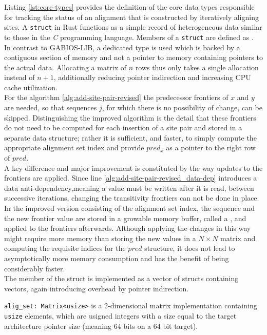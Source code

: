 Listing \ref{lst:core-types} provides the definition of the core data types responsible for tracking the status of an alignment that is constructed by iteratively aligning sites. A \texttt{struct} in Rust functions as a simple record of heterogeneous data similar to those in the \textit{C} programming language. Members of a \texttt{struct} are defined as .\\
In contrast to GABIOS-LIB, a dedicated  type is used which is backed by a contiguous section of memory and not a pointer to memory containing pointers to the actual data. Allocating a matrix of $n$ rows thus only takes a single allocation instead of $n+1$, additionally reducing pointer indirection and increasing CPU cache utilization.\\
For the algorithm \ref{alg:add-site-pair-revised} the predecessor frontiers of $x$ and $y$ are needed, so that sequences $j$, for which there is no possibility of change, can be skipped. Distinguishing the improved algorithm is the detail that these frontiers do not need to be computed for each insertion of a site pair and stored in a separate data structure; rather it is sufficient, and faster, to simply compute the appropriate alignment set index and provide $pred_x$ as a pointer to the right row of $pred$.\\
A key difference and major improvement is constituted by the way updates to the frontiers are applied. Since line \ref{alg:add-site-pair-revised_data-dep} introduces a data anti-dependency,meaning a value must be written after it is read, between successive iterations, changing the transitivity frontiers can not be done in place. In the improved version  consisting of the alignment set index, the sequence and the new frontier value are stored in a growable memory buffer, called a , and applied to the frontiers afterwards. Although applying the changes in this way might require more memory than storing the new values in a $N\times N$ matrix and computing the requisite indices for the $pred$ structure, it does not lead to asymptotically more memory consumption and has the benefit of being considerably faster.\\
The member  of the  struct is implemented as a vector of structs containing vectors, again introducing overhead by pointer indirection. 

\texttt{alig_set: Matrix<usize>} is a 2-dimensional matrix implementation containing \texttt{usize} elements, which are usigned integers with a size equal to the target architecture pointer size (meaning 64 bits on a 64 bit target). 


